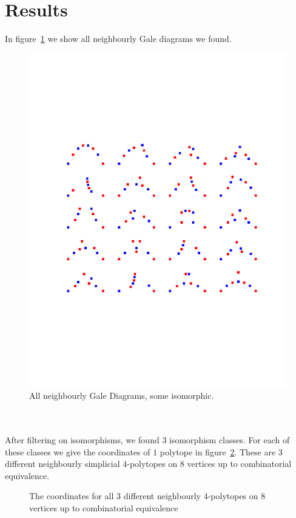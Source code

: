 \documentclass[paper=a4, fontsize=11pt]{scrartcl} %
\theoremstyle{definition}
\begin{document}
\section{Results}
In figure~\ref{fig:gale} we show all neighbourly Gale diagrams we found.
\begin{figure}[!htb]
\centering
\includegraphics[trim={0 5cm 0 5cm},clip,width=\textwidth]{gale_diagrams.pdf}
\caption{All neighbourly Gale Diagrams, some isomorphic.}
\label{fig:gale}
\end{figure}\\
\\
After filtering on isomorphisms, we found $3$ isomorphism classes. For each of these classes we give the coordinates of $1$ polytope in figure~\ref{fig:polyPoints}. These are $3$ different neighbourly simplicial $4$-polytopes on $8$ vertices up to combinatorial equivalence.
\begin{figure}[!htb]

\caption{The coordinates for all $3$ different neighbourly $4$-polytopes on $8$ vertices up to combinatorial equivalence}
\label{fig:polyPoints}
\end{figure}
\end{document}
